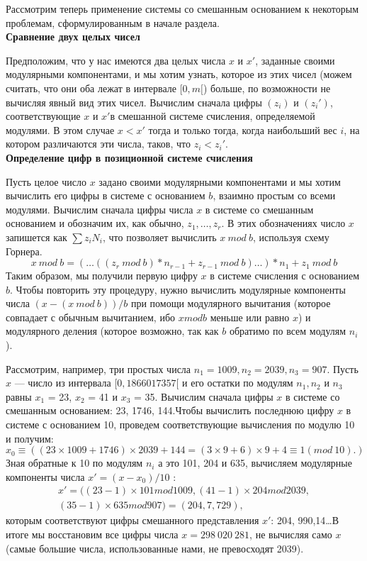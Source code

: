 Рассмотрим теперь применение системы со смешанным основанием
к некоторым проблемам, сформулированным в начале раздела. \\
\textbf{Сравнение двух целых чисел} \par
 Предположим, что у нас имеются два целых числа $x$ и $x'$, 
заданные своими модулярными компонентами, и мы хотим узнать, которое
из этих чисел (можем считать, что они оба лежат в интервале $[0, m[$)
больше, по возможности не вычисляя явный вид этих чисел. Вычислим
сначала цифры $(z_{i})$ и $(z_{i}')$, соответствующие $x$ и $x'$в смешанной системе счисления, определяемой модулями. В этом случае $x < x'$ тогда и 
только тогда, когда наибольший вес $i$, на котором различаются эти числа,
таков, что $z_{i} < z_{i}'$. \\
\textbf{Определение цифр в позиционной системе счисления} \par
 Пусть целое число $x$ задано своими модулярными компонентами и
мы хотим вычислить его цифры в системе с основанием $b$, взаимно
простым со всеми модулями. Вычислим сначала цифры числа $x$ в 
системе со смешанным основанием и обозначим их, как обычно, $z_{1},\ldots,z_{r}$. В этих обозначениях число $x$ запишется как $\sum z_{i}N_{i}$, что позволяет вычислить $x\ mod\ b$, используя схему Горнера.
$$x\ mod\ b = (\ldots((z_{r}\ mod\ b)* n_{r-1} +z_{r-1}\ mod\ b)\ldots)*n_{1}+ z_{1}\ mod\ b $$
\pagebreak
\newpage
Таким образом, мы получили первую цифру $x$ в системе счисления с
основанием $b$. Чтобы повторить эту процедуру, нужно вычислить 
модулярные компоненты числа $(x - (x\ mod\ b))/b$ при помощи 
модулярного вычитания (которое совпадает с обычным вычитанием, ибо $x mod b$
меньше или равно $x$) и модулярного деления (которое возможно, так
как $b$ обратимо по всем модулям $n_{i}$).\par
Рассмотрим, например, три простых числа $n_{1} = 1009, n_{2} = 2039,
n_{3} = 907$. Пусть $x$ — число из интервала $[0, 1 866 017 357[$ и его остатки по модулям $n_{1}, n_{2}$ и $n_{3}$ равны $x_{1}$ = 23, $x_{2}$ = 41 и $x_{3}$ = 35. Вычислим сначала цифры $x$ в системе со смешанным основанием: 23, 1746, 144.Чтобы вычислить последнюю цифру $x$ в системе с основанием 10, 
проведем соответствующие вычисления по модулю 10 и получим:
$$x_{0}\equiv((23 \times 1009 + 1746) \times 2039 + 144 = (3 \times 9 + 6) \times 9 + 4 \equiv 1 (mod\ 10).)$$
Зная обратные к 10 по модулям $n_{i}$ а это 101, 204 и 635, вычисляем
модулярные компоненты числа $x' = (x - x_{0})/10$ :
\begin{equation*}
\begin{split}
x' = ((23 - 1) \times 101 mod 1009, (41 - 1) \times 204 mod 2039, \\
(35 - 1) \times 635 mod 907) = (204, 7, 729),
\end{split}
\end{equation*}
которым соответствуют цифры смешанного представления $x'$:
204, 990,14\ldots В итоге мы восстановим все цифры числа $x = 298\ 020\ 281$,
не вычисляя само $x$ (самые большие числа, использованные нами, не
превосходят 2039).\\
\sectiontop
